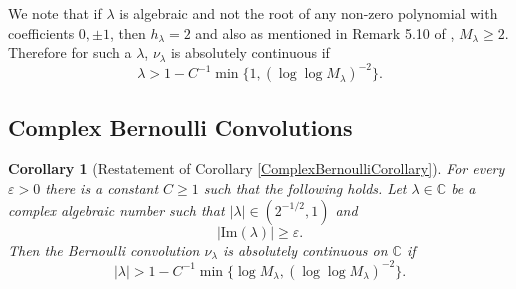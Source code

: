 \documentclass[10pt, english,oneside,reqno]{amsart}
\newtheorem*{corollary*}{Corollary}
\theoremstyle{plain}
\theoremstyle{remark}
\numberwithin{equation}{section}
\numberwithin{figure}{section}
\newcommand{\C}{\mathbb{C}}
\begin{document}
    We note that if $\lambda$ is algebraic and not the root of any non-zero polynomial with coefficients $0,\pm 1$, then $h_{\lambda} = 2$ and also as mentioned in Remark 5.10 of \cite{Kittle2021}, $M_{\lambda} \geq 2$. Therefore for such a $\lambda$, $\nu_{\lambda}$ is absolutely continuous if 
    \begin{equation}\label{BernoulliCondSimplified}
            \lambda > 1 - C^{-1}\min\{1,(\log \log M_{\lambda})^{-2} \}.
    \end{equation}

\subsection{Complex Bernoulli Convolutions}
\label{section:ComplexBern}

\begin{corollary*}[Restatement of Corollary \ref{ComplexBernoulliCorollary}]
		For every $\varepsilon > 0$ there is a constant $C \geq 1$ such that the following holds. Let $\lambda \in \mathbb{C}$ be a complex algebraic number such that $|\lambda| \in (2^{-1/2}, 1)$ and 
		\begin{equation}
		|\mathrm{Im}(\lambda)| \geq \varepsilon. \label{eq:SomeImaginaryPart}
		\end{equation} Then the Bernoulli convolution $\nu_{\lambda}$ is absolutely continuous on $\C$ if 
		\begin{equation*}
		|\lambda| > 1 - C^{-1}\min\{\log M_{\lambda},(\log \log M_{\lambda})^{-2} \} .
		\end{equation*}
\end{corollary*}
\end{document}
